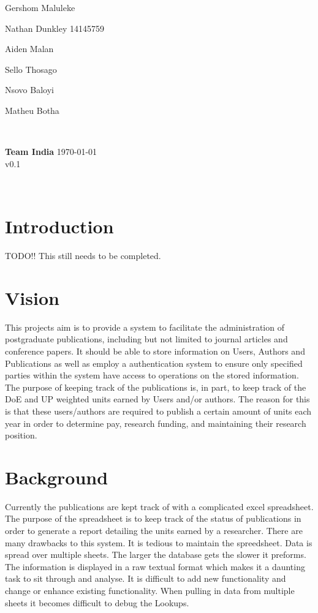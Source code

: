 \documentclass{article}
\begin{document}
\begin{titlepage}
\begin{minipage}{0.4\textwidth}
\begin{flushleft}
	Gershom Maluleke

	Nathan Dunkley 14145759

	Aiden Malan

	Sello Thosago

	Nsovo Baloyi

	Matheu Botha 
	\end{flushleft}
	\end{minipage}
	~
	\begin{minipage}{0.4\textwidth}
	\begin{flushright} \large
	{ \huge \bfseries Team India }%
	{\large \today}\\
	{\large v0.1}
	\end{flushright}
	\end{minipage}\\[4cm]
\end{titlepage}


	\newpage
	
	\section{Introduction}
	
	TODO!! This still needs to be completed.

	\section{Vision}

	This projects aim is to provide a system to facilitate the administration of postgraduate publications, including but not limited to journal articles and conference papers. It should be able to store information on Users, Authors and Publications as well as employ a authentication system to ensure only specified parties within the system have access to operations on the stored information.
	The purpose of keeping track of the publications is, in part, to keep track of the DoE and UP weighted units earned by Users and/or authors. The reason for this is that these users/authors are required to publish a certain amount of units each year in order to determine pay, research funding, and maintaining their research position.

	\section{Background}
	Currently the publications are kept track of with a complicated excel spreadsheet. The purpose of the spreadsheet is to keep track of the status of publications in order to generate a report detailing the units earned by a researcher. There are many drawbacks to this system. It is tedious to maintain the spreedsheet. Data is spread over multiple sheets. The larger the database gets the slower it preforms. The information is displayed in a raw textual format which makes it a daunting task to sit through and analyse. It is difficult to add new functionality and change or enhance existing functionality. When pulling in data from multiple sheets it becomes difficult to debug the Lookups.
\end{document}
